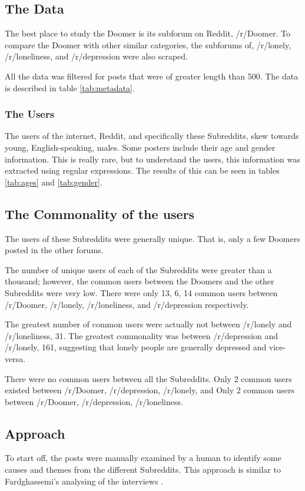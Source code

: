 \documentclass[../report.tex]{subfiles}
\begin{document}
\subsection{The Data}
The best place to study the Doomer is its subforum on Reddit, /r/Doomer. To compare the Doomer with other similar categories, the subforums of, /r/lonely, /r/loneliness, and /r/depression were also scraped.

All the data was filtered for posts that were of greater length than 500. The data is described in table \ref{tab:metadata}.

\subsubsection{The Users}
The users of the internet, Reddit, and specifically these Subreddits, skew towards young, English-speaking, males. 
Some posters include their age and gender information.
This is really rare, but to understand the users, this information was extracted using regular expressions.
The results of this can be seen in tables \ref{tab:ages} and \ref{tab:gender}.

\subsection{The Commonality of the users}
The users of these Subreddits were generally unique.
That is, only a few Doomers posted in the other forums. 

The number of unique users of each of the Subreddits were greater than a thousand; however, the common users between the Doomers and the other Subreddits were very low. 
There were only 13, 6, 14 common users between /r/Doomer, /r/lonely, /r/loneliness, and /r/depression respectively. 

The greatest number of common users were actually not between /r/lonely and /r/loneliness, 31. 
The greatest commonality was between /r/depression and /r/lonely, 161, suggesting that lonely people are generally depressed and vice-versa.

There were no common users between all the Subreddits.
Only 2 common users existed between /r/Doomer, /r/depression, /r/lonely, and Only 2 common users between /r/Doomer, /r/depression, /r/loneliness.



\subsection{Approach}
To start off, the posts were manually examined by a human to identify some causes and themes from the different Subreddits. 
This approach is similar to Fardghassemi's analysing of the interviews \cite{fardghassemi_interviews}.
\end{document}
